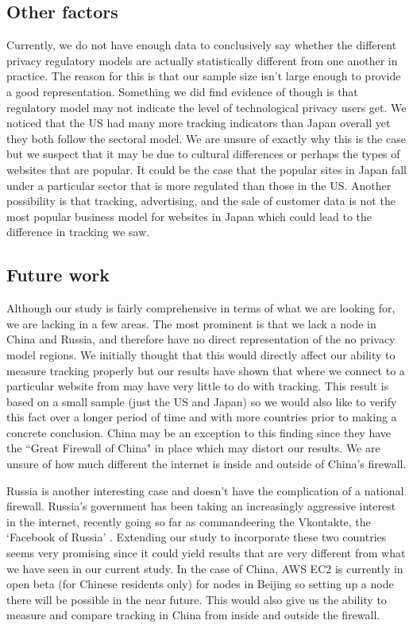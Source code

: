 \documentclass[conference]{IEEEtran}
\begin{document}
\subsection{Other factors}
Currently, we do not have enough data to conclusively say whether the different privacy regulatory models are actually statistically different from one another in practice. The reason for this is that our sample size isn't large enough to provide a good representation. Something we did find evidence of though is that regulatory model may not indicate the level of technological privacy users get. We noticed that the US had many more tracking indicators than Japan overall yet they both follow the sectoral model. We are unsure of exactly why this is the case but we suspect that it may be due to cultural differences or perhaps the types of websites that are popular. It could be the case that the popular sites in Japan fall under a particular sector that is more regulated than those in the US. Another possibility is that tracking, advertising, and the sale of customer data is not the most popular business model for websites in Japan which could lead to the difference in tracking we saw.

\subsection{Future work}
Although our study is fairly comprehensive in terms of what we are looking for, we are lacking in a few areas. The most prominent is that we lack a node in China and Russia, and therefore have no direct representation of the no privacy model regions. We initially thought that this would directly affect our ability to measure tracking properly but our results have shown that where we connect to a particular website from may have very little to do with tracking. This result is based on a small sample (just the US and Japan) so we would also like to verify this fact over a longer period of time and with more countries prior to making a concrete conclusion. China may be an exception to this finding since they have the ``Great Firewall of China" in place which may distort our results. We are unsure of how much different the internet is inside and outside of China's firewall. 

Russia is another interesting case and doesn't have the complication of a national firewall. Russia's government has been taking an increasingly aggressive interest in the internet, recently going so far as commandeering the Vkontakte, the `Facebook of Russia' \cite{toor}. Extending our study to incorporate these two countries seems very promising since it could yield results that are very different from what we have seen in our current study. In the case of China, AWS EC2 is currently in open beta (for Chinese residents only) for nodes in Beijing so setting up a node there will be possible in the near future. This would also give us the ability to measure and compare tracking in China from inside and outside the firewall.
\end{document}
